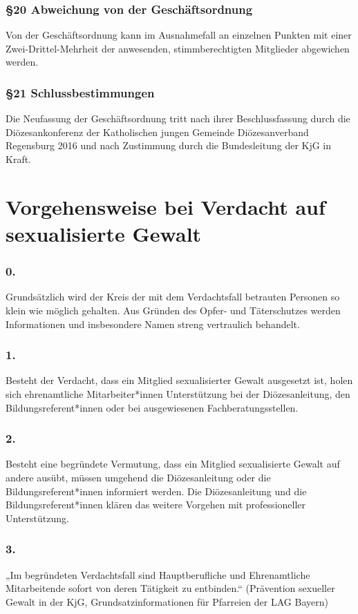 \documentclass[12pt]{report}
\begin{document}
\begin{flushleft}
\subsection*{§20 Abweichung von der Geschäftsordnung}
Von der Geschäftsordnung kann im Ausnahmefall an einzelnen Punkten mit einer Zwei-Drittel-Mehrheit der
anwesenden, stimmberechtigten Mitglieder abgewichen werden.
\subsection*{§21 Schlussbestimmungen}
Die Neufassung der Geschäftsordnung tritt nach ihrer Beschlussfassung durch die Diözesankonferenz der
Katholischen jungen Gemeinde Diözesanverband Regensburg 2016 und nach Zustimmung durch
die Bundesleitung der KjG in Kraft.


\chapter*{Vorgehensweise bei Verdacht auf sexualisierte Gewalt}
\subsection*{ 0.}
Grundsätzlich wird der Kreis der mit dem Verdachtsfall betrauten Personen so klein wie möglich gehalten.
Aus Gründen des Opfer- und Täterschutzes werden Informationen und insbesondere Namen  
streng vertraulich behandelt.
\subsection*{1.}
Besteht der Verdacht, dass ein Mitglied sexualisierter Gewalt ausgesetzt ist, holen sich ehrenamtliche
Mitarbeiter*innen Unterstützung bei der Diözesanleitung, den Bildungsreferent*innen oder bei  
ausgewiesenen Fachberatungsstellen.
\subsection*{2.}
Besteht eine begründete Vermutung, dass ein Mitglied sexualisierte Gewalt auf andere ausübt, müssen
umgehend die Diözesanleitung oder die Bildungsreferent*innen informiert werden. Die Diözesanleitung
und die Bildungsreferent*innen klären das weitere Vorgehen mit professioneller Unterstützung.
\subsection*{3.}
„Im begründeten Verdachtsfall sind Hauptberufliche und Ehrenamtliche Mitarbeitende sofort von  
deren Tätigkeit zu entbinden.“
(Prävention sexueller Gewalt in der KjG, Grundsatzinformationen für Pfarreien der LAG Bayern)

\end{flushleft}
\end{document}
